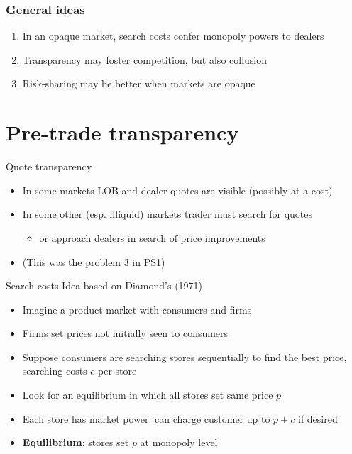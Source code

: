 \documentclass[english,10pt
,aspectratio=169
]{beamer}
\begin{document}
\begin{frame}[label=ideas]
	\frametitle{General ideas}
	\begin{enumerate}
		\item In an opaque market, search costs confer monopoly powers to dealers
		\item Transparency may foster competition, but also collusion
		\item Risk-sharing may be better when markets are opaque
	\end{enumerate}
	\hyperlink{example}{}
\end{frame}



\section{Pre-trade transparency}

\begin{frame}{Quote transparency}
	\begin{itemize}
		\item In some markets LOB and dealer quotes are visible (possibly at a cost)
		\item In some other (esp. illiquid) markets trader must search for quotes 
		\begin{itemize}
			\item or approach dealers in search of price improvements
		\end{itemize}
		\item (This was the problem 3 in PS1)
	\end{itemize}
\end{frame}


\begin{frame}{Search costs}
	Idea based on Diamond's (1971) 
	\begin{itemize}
		\item Imagine a product market with consumers and firms
		\item Firms set prices not initially seen to consumers
		\item Suppose consumers are searching stores sequentially to find the best price, searching costs $c$ per store
		\item Look for an equilibrium in which all stores set same price $p$
		\item Each store has market power: can charge customer up to $p+c$ if desired
		\item \textbf{Equilibrium}: stores set $p$ at monopoly level
	\end{itemize}
\end{frame}
\end{document}
